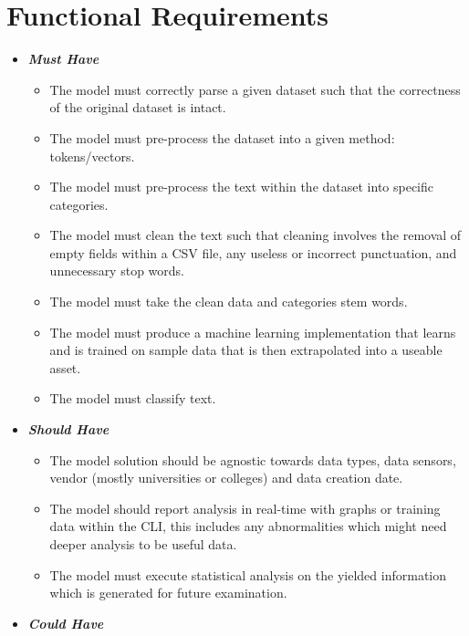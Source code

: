 \section{Functional Requirements} \label{section:FunctionalRequirements}

\begin{itemize}
    \item \textbf{\textit{Must Have}}
        \begin{itemize}\label{FMH}
            \item The model must correctly parse a given dataset such that the correctness of the original dataset is intact.
            \item The model must pre-process the dataset into a given method: tokens/vectors.
            \item The model must pre-process the text within the dataset into specific categories.
            \item The model must clean the text such that cleaning involves the removal of empty fields within a CSV file, any useless or incorrect punctuation, and unnecessary stop words.
            \item The model must take the clean data and categories stem words.
            \item The model must produce a machine learning implementation that learns and is trained on sample data that is then extrapolated into a useable asset.
            \item The model must classify text.
        \end{itemize}
    \item \textbf{\textit{Should Have}}
        \begin{itemize}\label{FSH}
            \item The model solution should be agnostic towards data types, data sensors, vendor (mostly universities or colleges) and data creation date.
            \item The model should report analysis in real-time with graphs or training data within the CLI, this includes any abnormalities which might need deeper analysis to be useful data.
            \item The model must execute statistical analysis on the yielded information which is generated for future examination.
        \end{itemize}
    \item \textbf{\textit{Could Have}}

\end{itemize}
